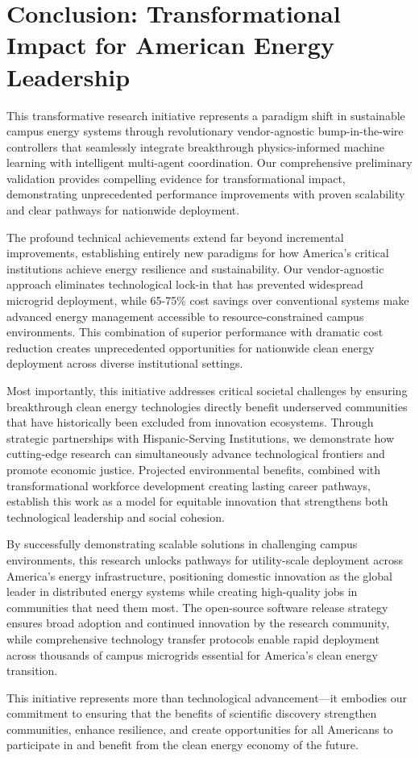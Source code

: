 \documentclass[12pt]{article}
\begin{document}
\section{Conclusion: Transformational Impact for American Energy Leadership}

This transformative research initiative represents a paradigm shift in sustainable campus energy systems through revolutionary vendor-agnostic bump-in-the-wire controllers that seamlessly integrate breakthrough physics-informed machine learning with intelligent multi-agent coordination. Our comprehensive preliminary validation provides compelling evidence for transformational impact, demonstrating unprecedented performance improvements with proven scalability and clear pathways for nationwide deployment.

The profound technical achievements extend far beyond incremental improvements, establishing entirely new paradigms for how America's critical institutions achieve energy resilience and sustainability. Our vendor-agnostic approach eliminates technological lock-in that has prevented widespread microgrid deployment, while 65-75\% cost savings over conventional systems make advanced energy management accessible to resource-constrained campus environments. This combination of superior performance with dramatic cost reduction creates unprecedented opportunities for nationwide clean energy deployment across diverse institutional settings.

Most importantly, this initiative addresses critical societal challenges by ensuring breakthrough clean energy technologies directly benefit underserved communities that have historically been excluded from innovation ecosystems. Through strategic partnerships with Hispanic-Serving Institutions, we demonstrate how cutting-edge research can simultaneously advance technological frontiers and promote economic justice. Projected environmental benefits, combined with transformational workforce development creating lasting career pathways, establish this work as a model for equitable innovation that strengthens both technological leadership and social cohesion.

By successfully demonstrating scalable solutions in challenging campus environments, this research unlocks pathways for utility-scale deployment across America's energy infrastructure, positioning domestic innovation as the global leader in distributed energy systems while creating high-quality jobs in communities that need them most. The open-source software release strategy ensures broad adoption and continued innovation by the research community, while comprehensive technology transfer protocols enable rapid deployment across thousands of campus microgrids essential for America's clean energy transition.

This initiative represents more than technological advancement---it embodies our commitment to ensuring that the benefits of scientific discovery strengthen communities, enhance resilience, and create opportunities for all Americans to participate in and benefit from the clean energy economy of the future.



\end{document}
